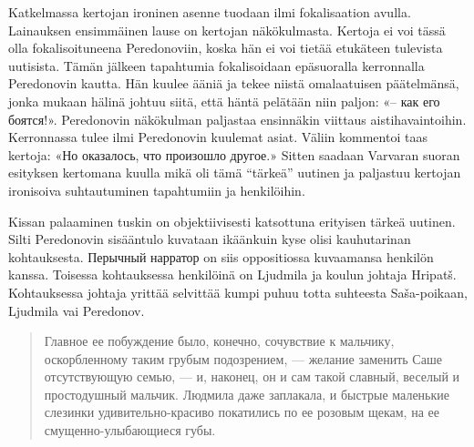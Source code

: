 \documentclass[12pt,a4paper]{article}
\begin{document}
Katkelmassa kertojan ironinen asenne tuodaan ilmi fokalisaation avulla. Lainauksen ensimmäinen lause on kertojan näkökulmasta. 
Kertoja ei voi tässä olla fokalisoituneena Peredonoviin, koska
hän ei voi tietää etukäteen tulevista uutisista. Tämän jälkeen tapahtumia
fokalisoidaan epäsuoralla kerronnalla Peredonovin kautta.
Hän kuulee ääniä ja tekee niistä omalaatuisen päätelmänsä, jonka mukaan hälinä
johtuu siitä, että häntä pelätään niin paljon: «– как его боятся!».
Peredonovin näkökulman paljastaa ensinnäkin viittaus aistihavaintoihin. Kerronnassa tulee ilmi Peredonovin kuulemat asiat. Väliin kommentoi taas kertoja: «Но оказалось, что произошло другое.» Sitten saadaan
Varvaran suoran esityksen kertomana kuulla mikä oli tämä \enquote{tärkeä} uutinen ja
paljastuu kertojan ironisoiva suhtautuminen tapahtumiin ja henkilöihin.

Kissan palaaminen tuskin on objektiivisesti katsottuna erityisen tärkeä uutinen.
Silti Peredonovin sisääntulo kuvataan ikäänkuin kyse olisi kauhutarinan 
kohtauksesta. Перычный нарратор on siis oppositiossa kuvaamansa henkilön kanssa.
% 
% 
Toisessa kohtauksessa henkilöinä on Ljudmila ja koulun johtaja Hripatš. Kohtauksessa johtaja yrittää selvittää kumpi puhuu totta suhteesta Saša-poikaan, Ljudmila vai Peredonov.

\begin{quote}
Главное ее побуждение было,
конечно, сочувствие к мальчику, оскорбленному таким грубым 
подозрением, — желание заменить Саше отсутствующую семью, — и, 
наконец, он и сам такой славный, веселый и простодушный мальчик. 
Людмила даже заплакала, и быстрые маленькие слезинки 
удивительно-красиво покатились по ее розовым щекам, на ее смущенно-улыбающиеся
губы. \parencite[239]{sologub2004}
\end{quote}
\end{document}
